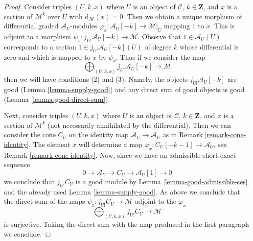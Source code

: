 \begin{proof}
Consider triples $(U, k, x)$ where $U$ is an object of $\mathcal{C}$,
$k \in \mathbf{Z}$, and $x$ is a section of $\mathcal{M}^k$ over $U$
with $\text{d}_\mathcal{M}(x) = 0$. Then we obtain a unique morphism
of differential graded $\mathcal{A}_U$-modules
$\varphi_x : \mathcal{A}_U[-k] \to \mathcal{M}|_U$
mapping $1$ to $x$. This is adjoint to a morphism
$\psi_x : j_{U!}\mathcal{A}_U[-k] \to \mathcal{M}$.
Observe that $1 \in \mathcal{A}_U(U)$ corresponds to
a section $1 \in j_{U!}\mathcal{A}_U[-k](U)$ of degree $k$
whose differential is zero and which is mapped to $x$ by $\psi_x$.
Thus if we consider the map
$$
\bigoplus\nolimits_{(U, k, x)} j_{U!}\mathcal{A}_U[-k]
\longrightarrow
\mathcal{M}
$$
then we will have conditions (2) and (3). Namely, the objects
$j_{U!}\mathcal{A}_U[-k]$ are good (Lemma \ref{lemma-supply-good})
and any direct sum of good objects is good (Lemma \ref{lemma-good-direct-sum}).

\medskip\noindent
Next, consider triples $(U, k, x)$ where $U$ is an object of $\mathcal{C}$,
$k \in \mathbf{Z}$, and $x$ is a section of $\mathcal{M}^k$ (not necessarily
annihilated by the differential). Then we can consider
the cone $C_U$ on the identity map $\mathcal{A}_U \to \mathcal{A}_U$
as in Remark \ref{remark-cone-identity}. The element $x$ will determine a map
$\varphi_x : C_U[-k - 1] \to \mathcal{A}_U$, see
Remark \ref{remark-cone-identity}. Now, since we have
an admissible short exact sequence
$$
0 \to \mathcal{A}_U \to C_U \to \mathcal{A}_U[1] \to 0
$$
we conclude that $j_{U!}C_U$ is a good module by
Lemma \ref{lemma-good-admissible-ses} and
the already used Lemma \ref{lemma-supply-good}.
As above we conclude that the direct sum of the maps
$\psi_x : j_{U!}C_U \to \mathcal{M}$ adjoint to the $\varphi_x$
$$
\bigoplus\nolimits_{(U, k, x)} j_{U!}C_U \longrightarrow \mathcal{M}
$$
is surjective. Taking the direct sum with the map produced
in the first paragraph we conclude.
\end{proof}

